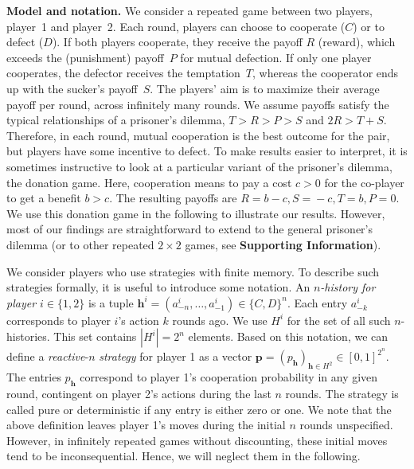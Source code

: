 \documentclass[11pt]{article}
\def\SI{\textbf{Supporting Information}}
\begin{document}

\textbf{Model and notation.}
We consider a repeated game between two players, player~1 and player~2.
Each round, players can choose to cooperate ($C$) or to defect ($D$). 
If both players cooperate, they receive the payoff $R$ (reward), which exceeds the (punishment) payoff~$P$ for mutual defection. 
If only one player cooperates, the defector receives the temptation~$T$, whereas the cooperator ends up with the sucker's payoff~$S$. 
The players' aim is to maximize their average payoff per round, across infinitely many rounds.
We assume payoffs satisfy the typical relationships of a prisoner's dilemma, $T \!>\! R \!>\! P \!>\! S$ and $2 R \!>\! T \!+\! S$. 
Therefore, in each round, mutual cooperation is the best outcome for the pair, but players have some incentive to defect. 
To make results easier to interpret, it is sometimes instructive to look at a particular variant of the prisoner's dilemma, the donation game. 
Here, cooperation means to pay a cost $c\!>\!0$ for the co-player to get a benefit $b\!>\!c$.
The resulting payoffs are \(R \!\!=\! b\! -\! c, S \!=\! -c, T \!=\! b, P\!
=\! 0\). 
We use this donation game in the following to illustrate our results. 
However, most of our findings are straightforward to extend to the general prisoner's dilemma (or to other repeated $2\!\times\!2$ games, see \SI). 

We consider players who use strategies with finite memory. 
To describe such strategies formally, it is useful to introduce some notation. 
An {\it $n$-history for player $i\! \in\! \{1, 2\}$} is a tuple $\mathbf{h}^i\!=\!(a^i_{-n},\ldots,a^i_{-1})\!\in\!\{C,D\}^n$. 
Each entry $a^i_{-k}$ corresponds to player $i$'s action $k$ rounds ago. 
We use $H^i$ for the set of all such $n$-histories. 
This set contains $|H^i|\!=\!2^{n}$ elements. 
Based on this notation, we can define a {\it reactive}-$n$ {\it strategy} for player 1 as a vector $\mathbf{p}\!=\!(p_\mathbf{h})_{\mathbf{h}\in H^2} \!\in\! [0, 1]^{2^n}$. 
The entries $p_\mathbf{h}$ correspond to player 1's cooperation probability in any given round, contingent on player 2's actions during the last $n$ rounds. 
The strategy is called pure or deterministic if any entry is either zero or one. 
We note that the above definition leaves player 1's moves during the initial $n$ rounds unspecified. 
However, in infinitely repeated games without discounting, these initial moves tend to be inconsequential. 
Hence, we will neglect them in the following.
\end{document}
